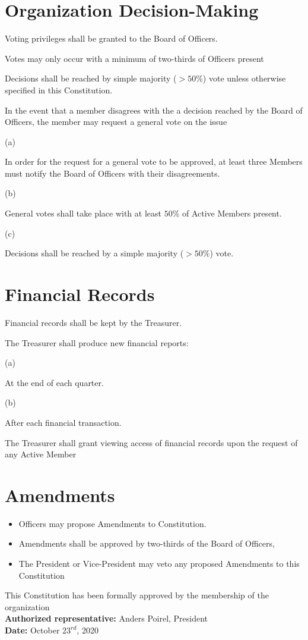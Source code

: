 \documentclass{article}
\newcommand{\SubItem}[1]{
    {\setlength\itemindent{15pt} \item[] #1}
}
\begin{document}
\section{Organization Decision-Making}
\begin{itemize}
    \item[1.] Voting privileges shall be granted to the Board of Officers.
    \item[2.] Votes may only occur with a minimum of two-thirds of Officers present 
    \item[2.] Decisions shall be reached by simple majority ($>50\%$) vote unless otherwise 
    specified in this Constitution.    
    \item[3.] In the event that a member disagrees with the a decision reached by the  
    Board of Officers, the member may request a general vote on the issue 
        \SubItem{(a)} In order for the request for a general vote to be approved, 
        at least three Members must notify the Board of Officers with their disagreements.
        \SubItem{(b)} General votes shall take place with at least $50\%$ of Active Members 
        present.
        \SubItem{(c)} Decisions shall be reached by a simple majority ($>50\%$) vote. 
\end{itemize}


\section{Financial Records}

\begin{itemize}
    \item[1.] Financial records shall be kept by the Treasurer.
    \item[2.] The Treasurer shall produce new financial reports:
        \SubItem{(a)} At the end of each quarter.
        \SubItem{(b)} After each financial transaction.   
    \item[3.] The Treasurer shall grant viewing access of financial records upon 
    the request of any Active Member   
\end{itemize}


\section{Amendments}

\begin{itemize}
    \item[1.] Officers may propose Amendments to Constitution. 
    \item[2.] Amendments shall be approved by two-thirds of the Board of Officers,
    \item[3.] The President or Vice-President may veto any proposed Amendments to this 
    Constitution 
\end{itemize}

\newpage

\begin{center}
    This Constitution has been formally approved by the membership of the organization \\
    \vspace{10pt}
    \textbf{Authorized representative:} Anders Poirel, President \\
    \vspace{10pt}
    \textbf{Date:} October $23^{rd}$, 2020
\end{center}
\end{document}
